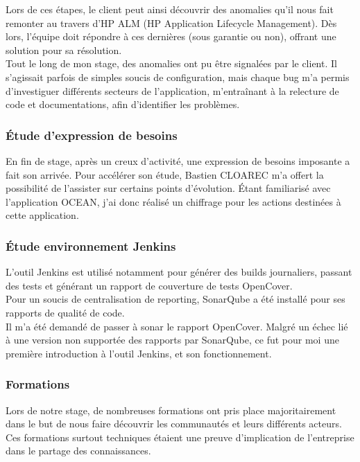 \documentclass{rapport}
\begin{document}
Lors de ces étapes, le client peut ainsi découvrir des anomalies qu'il nous fait remonter au travers d'HP ALM (HP Application Lifecycle Management). Dès lors, l'équipe doit répondre à ces dernières (sous garantie ou non), offrant une solution pour sa résolution.\\

Tout le long de mon stage, des anomalies ont pu être signalées par le client. Il s'agissait parfois de simples soucis de configuration, mais chaque bug m'a permis d'investiguer différents secteurs de l'application, m'entraînant à la relecture de code et documentations, afin d'identifier les problèmes.

\subsubsection{Étude d'expression de besoins}

En fin de stage, après un creux d'activité, une expression de besoins imposante a fait son arrivée. Pour accélérer son étude, Bastien CLOAREC m'a offert la possibilité de l'assister sur certains points d'évolution. Étant familiarisé avec l'application OCEAN, j'ai donc réalisé un chiffrage pour les actions destinées à cette application.

\subsubsection{Étude environnement Jenkins}

L'outil Jenkins est utilisé notamment pour générer des builds journaliers, passant des tests et générant un rapport de couverture de tests OpenCover.\\
Pour un soucis de centralisation de reporting, SonarQube a été installé pour ses rapports de qualité de code.\\
Il m'a été demandé de passer à sonar le rapport OpenCover. Malgré un échec lié à une version non supportée des rapports par SonarQube, ce fut pour moi une première introduction à l'outil Jenkins, et son fonctionnement.

\subsubsection{Formations}

Lors de notre stage, de nombreuses formations ont pris place majoritairement dans le but de nous faire découvrir les communautés et leurs différents acteurs. Ces formations surtout techniques étaient une preuve d'implication de l'entreprise dans le partage des connaissances.\\
\end{document}
